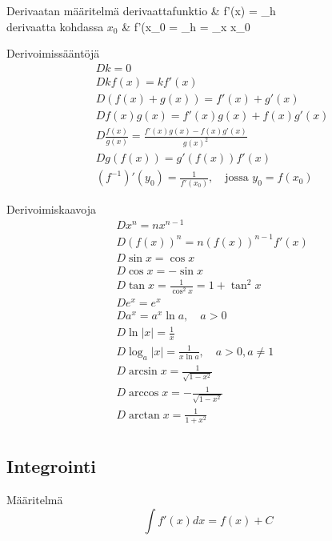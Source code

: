 \begin{eqtable}{Derivaatan määritelmä \cite[s. 41]{MAOL} }
derivaattafunktio			& f'(x) = \lim_{h }  \\
derivaatta kohdassa $x_0$	& f'(x_0 = \lim_{h }  = \lim_{x \rightarrow x_0}  \\
\end{eqtable}

Derivoimissääntöjä \cite[s. 41]{MAOL}
\begin{align*}
& Dk					= 0 \\
& Dkf(x)				= kf'(x) \\
& D(f(x) + g(x))		= f'(x) + g'(x) \\
& Df(x)g(x)			= f'(x)g(x)+f(x)g'(x) \\
& D \frac{f(x)}{g(x)}	= \frac{f'(x)g(x)-f(x)g'(x)}{g(x)^2} \\
& D g(f(x))			= g'(f(x))f'(x) \\
& (f^{-1})'(y_0)		= \frac{1}{f'(x_0)}, \quad \text{jossa } y_0 = f(x_0)
\end{align*}

Derivoimiskaavoja \cite[s. 41]{MAOL}
\begin{align*}
& Dx^n	= nx^{n-1} \\
& D(f(x))^n	= n(f(x))^{n-1} f'(x) \\
& D \sin x	= \cos x \\
& D \cos x	= -\sin x \\
& D \tan x	= \frac{1}{\cos^2 x} = 1 + \tan^2 x \\
& D e^x		= e^x \\
& D a^x		= a^x \ln a, \quad a>0 \\
& D \ln |x|	= \frac{1}{x} \\
& D \log_a |x|	= \frac{1}{x \ln a}, \quad a>0, a \neq 1 \\
& D \arcsin x	= \frac{1}{\sqrt{1-x^2}} \\
& D \arccos x	= - \frac{1}{\sqrt{1-x^2}} \\
& D \arctan x	= \frac{1}{1+x^2} \\
\end{align*}

\subsection{Integrointi}
Määritelmä \cite[(1.8)]{MAT-01360}
\begin{equation*}
\int f'(x) dx = f(x) + C
\end{equation*}

